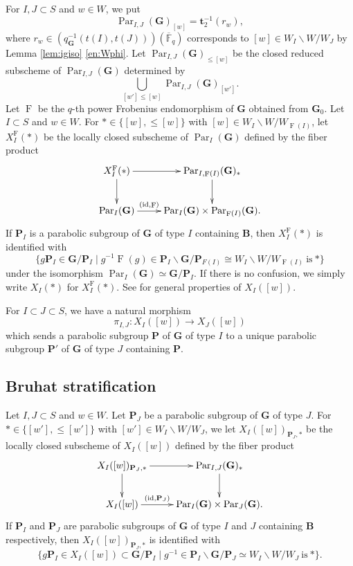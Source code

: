 \documentclass[12pt,a4paper]{article}
\DeclareMathOperator{\id}{id}
\DeclareMathOperator{\Par}{Par}
\DeclareMathOperator{\oF}{F}
\newcommand{\bF}{\mathbb{F}}
\newcommand{\bfB}{\mathbf{B}}
\newcommand{\bfG}{\mathbf{G}}
\newcommand{\bfP}{\mathbf{P}}
\newcommand{\bft}{\mathbf{t}}
\newcommand{\ol}{\overline}
\begin{document}
For $I, J \subset S$ and  $w \in W$, 
we put 
\[
 \Par_{I,J} (\bfG)_{[w]}=\bft_2^{-1}(r_w), 
\]
where $r_w \in (q_{\bfG}^{-1}(t(I),t(J)))(\ol{\bF}_q)$ 
corresponds to $[w] \in W_I \backslash W /W_J$ by 
Lemma \ref{lem:igiso} \ref{en:Wphi}. 
Let $\Par_{I,J} (\bfG)_{\leq [w]}$ be the closed reduced subscheme of $\Par_{I,J} (\bfG)$ 
determined by 
\[
 \bigcup_{[w'] \leq [w]} \Par_{I,J} (\bfG)_{[w']}. 
\]
Let $\oF$ be the $q$-th power Frobenius endomorphism of 
$\bfG$ obtained from $\bfG_0$. 
Let $I \subset S$ and  $w \in W$. 
For $* \in \{ [w], {\leq}[w] \}$ 
with $[w] \in W_I \backslash W /W_{\oF (I)}$, 
let $X_I^{\oF}(*)$ 
be the locally closed subscheme of $\Par_I (\bfG)$ 
defined by the fiber product 
\[
 \xymatrix{
 X_I^{\oF}(*)  \ar[r] \ar[d] &   \Par_{I,\oF (I)} (\bfG)_{*}         \ar[d] \\ 
  \Par_I (\bfG)  \ar[r]^-{(\id ,\oF)}   &  \Par_I (\bfG) \times \Par_{\oF (I)} (\bfG) .} 
\]
If $\bfP_I$ is a parabolic subgroup of 
$\bfG$ of type $I$ containing $\bfB$, then $X_I^{\oF}(*)$ is identified with 
\[
 \{ g \bfP_I \in \bfG/\bfP_I \mid g^{-1}\oF (g) \in \bfP_I\backslash \bfG / \bfP_{F(I)} \cong W_I \backslash W /W_{\oF (I)} \ \textrm{is} \ *\}
\]
under the isomorphism $\Par_I (\bfG) \simeq \bfG/\bfP_I$. 
If there is no confusion, we simply write $X_I(*)$ for $X_I^{\oF}(*)$. See \cite[\S 4.4]{VoWeGUII} for general properties of $X_I([w])$. 

For $I \subset J \subset S$, we have a natural morphism 
\[
 \pi_{I,J} \colon X_I([w]) \to X_J([w])
\] 
which sends a 
parabolic subgroup $\bfP$ of $\bfG$ of type $I$ 
to a unique parabolic subgroup $\bfP'$ of $\bfG$ of type $J$ containing $\bfP$. 

\subsection{Bruhat stratification}
Let $I, J \subset S$ and  $w \in W$. 
Let $\bfP_J$ be a parabolic subgroup of 
$\bfG$ of type $J$. 
For $* \in \{ [w'], {\leq}[w'] \}$ 
with $[w'] \in W_I \backslash W /W_J$, 
we let $X_I([w])_{\bfP_J,*}$ 
be the locally closed subscheme of $X_I([w])$ 
defined by the fiber product 
\[
 \xymatrix{
 X_I([w])_{\bfP_J,*}  \ar[r] \ar[d] &   \Par_{I,J} (\bfG)_{*}         \ar[d] \\ 
  X_I([w])  \ar[r]^-{(\id ,\bfP_J)}   &  \Par_I (\bfG) \times \Par_J (\bfG) .} 
\]
If $\bfP_I$ and $\bfP_J$ are parabolic subgroups of 
$\bfG$ of type $I$ and $J$ containing $\bfB$ respectively, then $X_I([w])_{\bfP_J,*}$ is identified with 
\[
 \{ g \bfP_I \in X_I([w]) \subset \bfG/\bfP_I \mid g^{-1} \in \bfP_I\backslash \bfG / \bfP_J \simeq W_I \backslash W /W_J \ \textrm{is} \ *\}. 
\]
\end{document}
